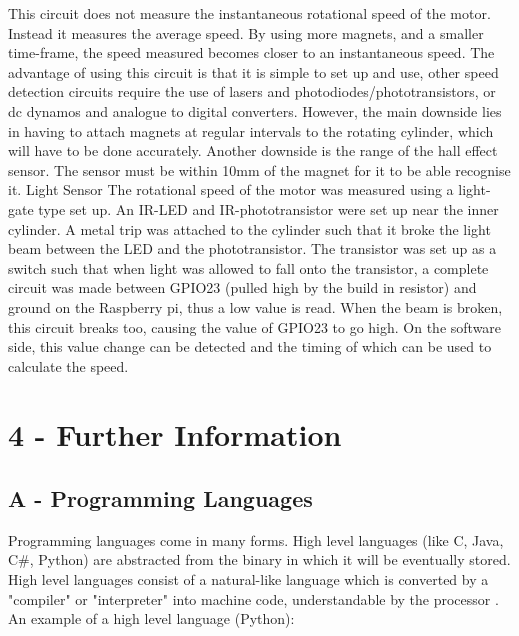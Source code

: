 \documentclass[twoside,a4]{report}
\def\br{\newline \newline \noindent}
\begin{document}
This circuit does not measure the instantaneous rotational speed of the motor. Instead it measures the average speed. By using more magnets, and a smaller time-frame, the speed measured becomes closer to an instantaneous speed. The advantage of using this circuit is that it is simple to set up and use, other speed detection circuits require the use of lasers and photodiodes/phototransistors, or dc dynamos and analogue to digital converters. However, the main downside lies in having to attach magnets at regular intervals to the rotating cylinder, which will have to be done accurately. Another downside is the range of the hall effect sensor. The sensor must be within 10mm of the magnet for it to be able recognise it. \newline \newline \noindent
\large Light Sensor \normalsize \br
The rotational speed of the motor was measured using a light-gate type set up. An IR-LED and IR-phototransistor were set up near the inner cylinder. A metal trip was attached to the cylinder such that it broke the light beam between the LED and the phototransistor. The transistor was set up as a switch such that when light was allowed to fall onto the transistor, a complete circuit was made between GPIO23 (pulled high by the build in resistor) and ground on the Raspberry pi, thus a low value is read. When the beam is broken, this circuit breaks too, causing the value of GPIO23 to go high. On the software side, this value change can be detected and the timing of which can be used to calculate the speed. \newline
\section{4 - Further Information}
\subsection{A -  Programming Languages}
Programming languages come in many forms. High level languages (like C, Java, C\#, Python) are abstracted from the binary in which it will be eventually stored. High level languages consist of a natural-like language which is converted by a "compiler" or "interpreter" into machine code, understandable by the processor \cite{proglanghighlow}. \br
\noindent
An example of a high level language (Python):
\end{document}
